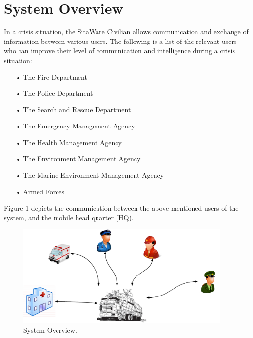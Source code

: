 \section{System Overview}
In a crisis situation, the SitaWare Civilian allows communication and exchange of information between various users. The following is a list of the relevant users who can improve their level of communication and intelligence during a crisis situation:

\begin{enumerate}
\item[•] The Fire Department
\item[•] The Police Department
\item[•] The Search and Rescue Department
\item[•] The Emergency Management Agency
\item[•] The Health Management Agency
\item[•] The Environment Management Agency
\item[•] The Marine Environment Management Agency
\item[•] Armed Forces
\end{enumerate}

Figure \ref{fig:system_overview} depicts the communication between the above mentioned users of the system, and the mobile head quarter (HQ). 

\begin{figure}[H]
\centering
\includegraphics[width=0.95\textwidth]
{../Conops/billeder/system_overview.pdf}
\caption{System Overview.}
\label{fig:system_overview}
\end{figure}


